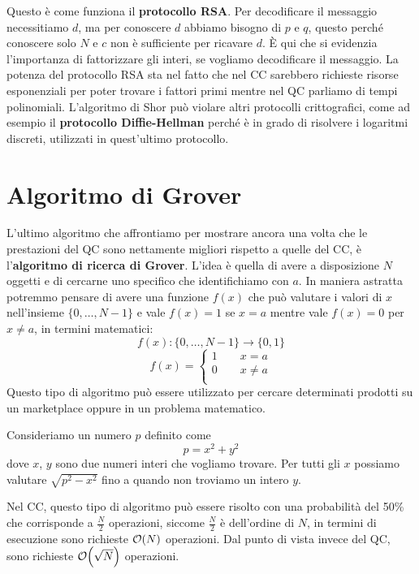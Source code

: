 Questo è come funziona il \textbf{protocollo RSA}. Per decodificare il messaggio necessitiamo $d$, ma per conoscere $d$ abbiamo bisogno di $p$ e $q$, questo perché conoscere solo $N$ e $c$ non è sufficiente per ricavare $d$. È qui che si evidenzia l'importanza di fattorizzare gli interi, se vogliamo decodificare il messaggio. La potenza del protocollo RSA sta nel fatto che nel CC sarebbero richieste risorse esponenziali per poter trovare i fattori primi mentre nel QC parliamo di tempi polinomiali. \newline
L'algoritmo di Shor può violare altri protocolli crittografici, come ad esempio il \textbf{protocollo Diffie-Hellman} perché è in grado di risolvere i logaritmi discreti, utilizzati in quest'ultimo protocollo.
\section{Algoritmo di Grover}
L'ultimo algoritmo che affrontiamo per mostrare ancora una volta che le prestazioni del QC sono nettamente migliori rispetto a quelle del CC, è l'\textbf{algoritmo di ricerca di Grover}. L'idea è quella di avere a disposizione $N$ oggetti e di cercarne uno specifico che identifichiamo con $a$. In maniera astratta potremmo pensare di avere una funzione $f(x)$ che può valutare i valori di $x$ nell'insieme $\{0,\dots, N-1\}$ e vale $f(x)=1$ se $x=a$ mentre vale $f(x)=0$ per $x\neq a$, in termini matematici:
\begin{equation*}
    f(x):\{0, \dots, N-1\}\rightarrow\{0,1\}
\end{equation*}
\begin{equation*}
    f(x)=\begin{cases}
        1 \qquad x=a\\
        0 \qquad x\neq a\\
    \end{cases}
\end{equation*}
Questo tipo di algoritmo può essere utilizzato per cercare determinati prodotti su un marketplace oppure in un problema matematico.
\begin{esempio}
    Consideriamo un numero $p$ definito come
    \begin{equation*}
        p=x^2+y^2
    \end{equation*}
    dove $x$, $y$ sono due numeri interi che vogliamo trovare. Per tutti gli $x$ possiamo valutare $\sqrt{p^2-x^2}$ fino a quando non troviamo un intero $y$.
\end{esempio}
\noindent Nel CC, questo tipo di algoritmo può essere risolto con una probabilità del 50\% che corrisponde a $\frac N2$ operazioni, siccome $\frac N2$ è dell'ordine di $N$, in termini di esecuzione sono richieste $\order{N}$ operazioni. Dal punto di vista invece del QC, sono richieste $\order{\sqrt N}$ operazioni. \newline
